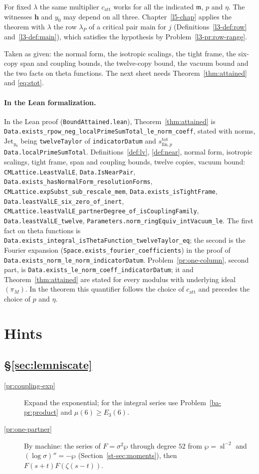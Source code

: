 \documentclass[reqno]{amsart}
\newcounter{chap}
\theoremstyle{definition}
\theoremstyle{plain}
\newcommand{\sll}{\operatorname{sl}}
\newcommand{\stot}{s^{\mathrm{tot}}_{\mathrm{fin},p}}
\newcommand{\catt}{c_{\mathrm{att}}}
\newcommand{\Jet}{\mathrm{Jet}}
\newcommand{\hb}{\mathbf h}
\newcommand{\tl}{\texttt}
\begin{document}
For fixed \(\lambda\) the same multiplier \(\catt\) works for all the indicated \(\mathfrak m\), \(p\) and \(\eta\).  The witnesses \(\hb\) and \(y_0\) may depend on all three.  Chapter~\ref{l5-chap} applies the theorem with \(\lambda\) the row \(\lambda_P\) of a critical pair main for \(j\) (Definitions~\ref{l3-def:row} and~\ref{l3-def:main}), which satisfies the hypothesis by Problem~\ref{l3-pr:row-range}.

Taken as given: the normal form, the isotropic scalings, the tight frame, the six-copy span and coupling bounds, the twelve-copy bound, the vacuum bound and the two facts on theta functions.  The next sheet needs Theorem~\ref{thm:attained} and \eqref{eq:stot}.

\paragraph{In the Lean formalization.}
In the Lean proof \cite{GL} (\tl{BoundAttained.lean}), Theorem~\ref{thm:attained} is \tl{Data.exists\_rpow\_neg\_localPrimeSumTotal\_le\_norm\_coeff}, stated with norms, \(\Jet_{y_0}\) being \tl{twelveTaylor} of \tl{indicatorDatum} and \(\stot\) \tl{Data.localPrimeSumTotal}.  Definitions~\ref{def:lv}, \ref{def:near}, normal form, isotropic scalings, tight frame, span and coupling bounds, twelve copies, vacuum bound: \tl{CMLattice.LeastValLE}, \tl{Data.IsNearPair}, \tl{Data.exists\_hasNormalForm\_resolutionForms}, \tl{CMLattice.expSubst\_sub\_rescale\_mem}, \tl{Data.exists\_isTightFrame}, \tl{Data.leastValLE\_six\_zero\_of\_inert}, \tl{CMLattice.leastValLE\_partnerDegree\_of\_isCouplingFamily}, \tl{Data.leastValLE\_twelve}, \tl{Parameters.norm\_ringEquiv\_intVacuum\_le}.  The first fact on theta functions is \tl{Data.exists\_integral\_isThetaFunction\_twelveTaylor\_eq}; the second is the Fourier expansion (\tl{Space.exists\_fourier\_coefficients}) in the proof of \tl{Data.exists\_norm\_le\_norm\_indicatorDatum}.  Problem~\ref{pr:one-column}, second part, is \tl{Data.exists\_le\_norm\_coeff\_indicatorDatum}; it and Theorem~\ref{thm:attained} are stated for every modulus with underlying ideal \((\pi_M)\).  In the theorem this quantifier follows the choice of \(\catt\) and precedes the choice of \(p\) and \(\eta\).

\section*{Hints}

\subsection*{\S\ref{sec:lemniscate}}
\begin{description}
\item[\ref{pr:coupling-exp}] Expand the exponential; for the integral series use Problem~\ref{ba-pr:product} and \(\mu(6) \ge E_3(6)\).
\item[\ref{pr:one-partner}] By machine: the series of \(F = \sigma^2\wp\) through degree \(52\) from \(\wp = \sll^{-2}\) and \((\log\sigma)'' = -\wp\) (Section~\ref{st-sec:moments}), then \(F(s+t)F(\zeta(s-t))\).
\end{description}
\end{document}
